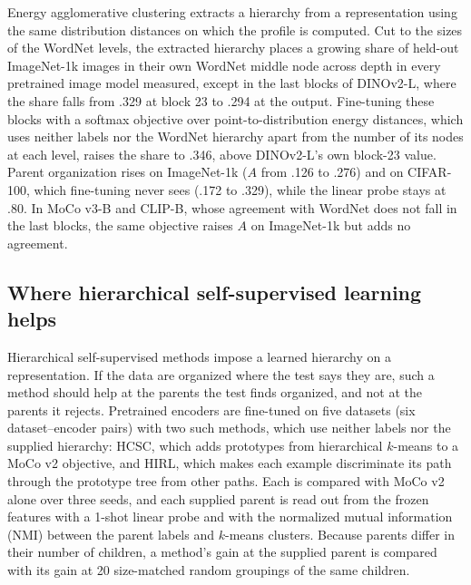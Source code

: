 \documentclass[11pt]{article}
\begin{document}
Energy agglomerative clustering extracts a hierarchy from a representation using the same distribution distances on which the profile is computed. Cut to the sizes of the WordNet levels, the extracted hierarchy places a growing share of held-out ImageNet-1k images in their own WordNet middle node across depth in every pretrained image model measured, except in the last blocks of DINOv2-L, where the share falls from .329 at block 23 to .294 at the output. Fine-tuning these blocks with a softmax objective over point-to-distribution energy distances, which uses neither labels nor the WordNet hierarchy apart from the number of its nodes at each level, raises the share to .346, above DINOv2-L's own block-23 value. Parent organization rises on ImageNet-1k ($A$ from .126 to .276) and on CIFAR-100, which fine-tuning never sees (.172 to .329), while the linear probe stays at .80. In MoCo v3-B and CLIP-B, whose agreement with WordNet does not fall in the last blocks, the same objective raises $A$ on ImageNet-1k but adds no agreement.

\subsection{Where hierarchical self-supervised learning helps}

Hierarchical self-supervised methods impose a learned hierarchy on a representation. If the data are organized where the test says they are, such a method should help at the parents the test finds organized, and not at the parents it rejects. Pretrained encoders are fine-tuned on five datasets (six dataset--encoder pairs) with two such methods, which use neither labels nor the supplied hierarchy: HCSC, which adds prototypes from hierarchical $k$-means to a MoCo v2 objective, and HIRL, which makes each example discriminate its path through the prototype tree from other paths. Each is compared with MoCo v2 alone over three seeds, and each supplied parent is read out from the frozen features with a 1-shot linear probe and with the normalized mutual information (NMI) between the parent labels and $k$-means clusters. Because parents differ in their number of children, a method's gain at the supplied parent is compared with its gain at 20 size-matched random groupings of the same children.
\end{document}

